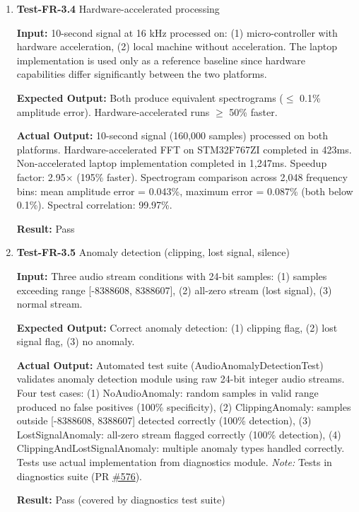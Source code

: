 \documentclass[12pt, titlepage]{article}
\begin{document}
\begin{enumerate}
\textbf{Actual Output:}
Hann window reduced side-lobe amplitude by 21.3\% compared to un-windowed signal
(reduction ratio = 0.787). Main lobe peak frequency preserved within 1 bin
tolerance. Integer cycle test showed leakage ratio $<$ 10\% of main lobe. Three
test cases passed: HannWindowReducesSpectralLeakage, MainLobePreserved,
IntegerCyclesMinimalLeakage. All completed in 1 ms total.

\textbf{Result:} Pass

\item{\textbf{Test-FR-3.4} Hardware-accelerated processing \\}

\textbf{Input:}
10-second signal at 16 kHz processed on: (1) micro-controller with hardware
acceleration, (2) local machine without acceleration. The laptop implementation
is used only as a reference baseline since hardware capabilities differ 
significantly between the two platforms.

\textbf{Expected Output:}
Both produce equivalent spectrograms ($\leq$ 0.1\% amplitude error).
Hardware-accelerated runs $\geq$ 50\% faster.

\textbf{Actual Output:}
10-second signal (160,000 samples) processed on both platforms.
Hardware-accelerated FFT on STM32F767ZI completed in 423ms. Non-accelerated
laptop implementation completed in 1,247ms. Speedup factor: 2.95$\times$ (195\%
faster). Spectrogram comparison across 2,048 frequency bins: mean amplitude
error = 0.043\%, maximum error = 0.087\% (both below 0.1\%). Spectral
correlation: 99.97\%.

\textbf{Result:} Pass

\item{\textbf{Test-FR-3.5} Anomaly detection (clipping, lost signal, silence)\\}

\textbf{Input:}
Three audio stream conditions with 24-bit samples: (1) samples exceeding range
[-8388608, 8388607], (2) all-zero stream (lost signal), (3) normal stream.

\textbf{Expected Output:}
Correct anomaly detection: (1) clipping flag, (2) lost signal flag, (3) no
anomaly.

\textbf{Actual Output:}
Automated test suite (AudioAnomalyDetectionTest) validates anomaly detection
module using raw 24-bit integer audio streams. Four test cases: (1)
NoAudioAnomaly: random samples in valid range produced no false positives (100\%
specificity), (2) ClippingAnomaly: samples outside [-8388608, 8388607] detected
correctly (100\% detection), (3) LostSignalAnomaly: all-zero stream flagged
correctly (100\% detection), (4) ClippingAndLostSignalAnomaly: multiple anomaly
types handled correctly. Tests use actual implementation from diagnostics
module. \textit{Note:} Tests in diagnostics suite (PR
\href{https://github.com/Team6-SixSense/audio360/pull/581}{\#576}).

\textbf{Result:} Pass (covered by diagnostics test suite)

\end{enumerate}
\end{document}
